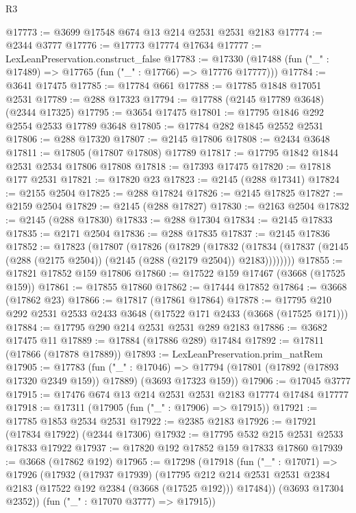 \begin{lexlean}{R3}
\begin{coremodule}
@17773 := @3699 @17548 @674 @13 @214 @2531 @2531 @2183
@17774 := @2344 @3777
@17776 := @17773 @17774 @17634
@17777 := LexLeanPreservation.construct_false
@17783 := @17330 (@17488 (fun ("_" : @17489) => @17765 (fun ("_" : @17766) => @17776 @17777)))
@17784 := @3641 @17475
@17785 := @17784 @661
@17788 := @17785 @1848 @17051 @2531
@17789 := @288 @17323
@17794 := @17788 (@2145 @17789 @3648) (@2344 @17325)
@17795 := @3654 @17475
@17801 := @17795 @1846 @292 @2554 @2533 @17789 @3648
@17805 := @17784 @282 @1845 @2552 @2531
@17806 := @288 @17320
@17807 := @2145 @17806
@17808 := @2434 @3648
@17811 := @17805 (@17807 @17808) @17789
@17817 := @17795 @1842 @1844 @2531 @2534 @17806 @17808
@17818 := @17393 @17475
@17820 := @17818 @177 @2531
@17821 := @17820 @23
@17823 := @2145 (@288 @17341)
@17824 := @2155 @2504
@17825 := @288 @17824
@17826 := @2145 @17825
@17827 := @2159 @2504
@17829 := @2145 (@288 @17827)
@17830 := @2163 @2504
@17832 := @2145 (@288 @17830)
@17833 := @288 @17304
@17834 := @2145 @17833
@17835 := @2171 @2504
@17836 := @288 @17835
@17837 := @2145 @17836
@17852 := @17823
    (@17807
      (@17826
        (@17829
          (@17832
            (@17834 (@17837 (@2145 (@288 (@2175 @2504)) (@2145 (@288 (@2179 @2504)) @2183))))))))
@17855 := @17821 @17852 @159 @17806
@17860 := @17522 @159 @17467 (@3668 (@17525 @159))
@17861 := @17855 @17860
@17862 := @17444 @17852
@17864 := @3668 (@17862 @23)
@17866 := @17817 (@17861 @17864)
@17878 := @17795 @210 @292 @2531 @2533 @2433 @3648 (@17522 @171 @2433 (@3668 (@17525 @171)))
@17884 := @17795 @290 @214 @2531 @2531 @289 @2183
@17886 := @3682 @17475 @11
@17889 := @17884 (@17886 @289) @17484
@17892 := @17811 (@17866 (@17878 @17889))
@17893 := LexLeanPreservation.prim_natRem
@17905 := @17783
    (fun ("_" : @17046) =>
    @17794 (@17801 (@17892 (@17893 @17320 @2349 @159)) @17889) (@3693 @17323 @159))
@17906 := @17045 @3777
@17915 := @17476 @674 @13 @214 @2531 @2531 @2183 @17774 @17484 @17777
@17918 := @17311 (@17905 (fun ("_" : @17906) => @17915))
@17921 := @17785 @1853 @2534 @2531
@17922 := @2385 @2183
@17926 := @17921 (@17834 @17922) (@2344 @17306)
@17932 := @17795 @532 @215 @2531 @2533 @17833 @17922
@17937 := @17820 @192 @17852 @159 @17833 @17860
@17939 := @3668 (@17862 @192)
@17965 := @17298
    (@17918
      (fun ("_" : @17071) =>
      @17926
        (@17932
          (@17937 @17939)
          (@17795
            @212
            @214
            @2531
            @2531
            @2384
            @2183
            (@17522 @192 @2384 (@3668 (@17525 @192)))
            @17484))
        (@3693 @17304 @2352))
      (fun ("_" : @17070 @3777) => @17915))

\end{coremodule}
\end{lexlean}
